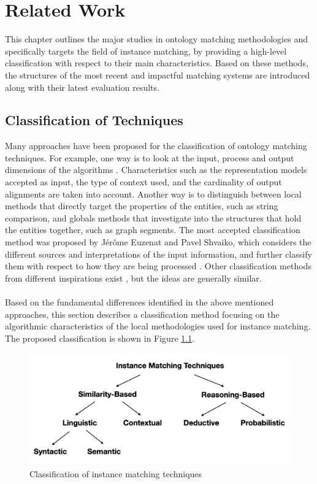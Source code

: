 \chapter{Related Work}

This chapter outlines the major studies in ontology matching methodologies and specifically targets the field of instance matching, by providing a high-level classification with respect to their main characteristics. Based on these methods, the structures of the most recent and impactful matching systems are introduced along with their latest evaluation results.


\section{Classification of Techniques}

Many approaches have been proposed for the classification of ontology matching techniques. For example, one way is to look at the input, process and output dimensions of the algorithms \cite{euzenat2013d}. Characteristics such as the representation models accepted as input, the type of context used, and the cardinality of output alignments are taken into account. Another way is to distinguish between local methods that directly target the properties of the entities, such as string comparison, and globals methods that investigate into the structures that hold the entities together, such as graph segments. The most accepted classification method was proposed by Jérôme Euzenat and Pavel Shvaiko, which considers the different sources and interpretations of the input information, and further classify them with respect to how they are being processed \cite{euzenat2013d}. Other classification methods from different inspirations exist \cite{DBLP:conf/swb/Ehrig2007,DBLP:conf/icde/MadhavanBDH05}, but the ideas are generally similar.
\\\\
Based on the fundamental differences identified in the above mentioned approaches, this section describes a classification method focusing on the algorithmic characteristics of the local methodologies used for instance matching. The proposed classification is shown in Figure \ref{fig:techniques}.

\begin{figure}[ht]
\includegraphics[width=\textwidth]{img/ontology_matching_classification.png}
\caption{Classification of instance matching techniques}
\label{fig:techniques}
\end{figure}

